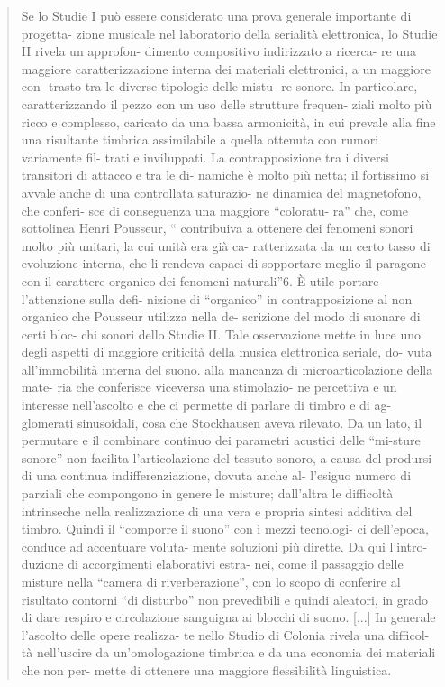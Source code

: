 \begin{quote}
Se lo Studie I può essere considerato una prova generale importante di progetta- zione musicale nel laboratorio della serialità elettronica, lo Studie II rivela un approfon- dimento compositivo indirizzato a ricerca- re una maggiore caratterizzazione interna dei materiali elettronici, a un maggiore con- trasto tra le diverse tipologie delle mistu- re sonore. In particolare, caratterizzando il pezzo con un uso delle strutture frequen- ziali molto più ricco e complesso, caricato da una bassa armonicità, in cui prevale alla fine una risultante timbrica assimilabile a quella ottenuta con rumori variamente fil- trati e inviluppati. La contrapposizione tra i diversi transitori di attacco e tra le di- namiche è molto più netta; il fortissimo si avvale anche di una controllata saturazio- ne dinamica del magnetofono, che conferi- sce di conseguenza una maggiore “coloratu- ra” che, come sottolinea Henri Pousseur, “ contribuiva a ottenere dei fenomeni sonori molto più unitari, la cui unità era già ca- ratterizzata da un certo tasso di evoluzione interna, che li rendeva capaci di sopportare meglio il paragone con il carattere organico dei fenomeni naturali”6.
È utile portare l’attenzione sulla defi- nizione di “organico” in contrapposizione al non organico che Pousseur utilizza nella de- scrizione del modo di suonare di certi bloc- chi sonori dello Studie II. Tale osservazione mette in luce uno degli aspetti di maggiore criticità della musica elettronica seriale, do- vuta all’immobilità interna del suono. alla mancanza di microarticolazione della mate- ria che conferisce viceversa una stimolazio- ne percettiva e un interesse nell’ascolto e che ci permette di parlare di timbro e di ag- glomerati sinusoidali, cosa che Stockhausen aveva rilevato.
Da un lato, il permutare e il combinare continuo dei parametri acustici delle “mi-sture sonore” non facilita l’articolazione del tessuto sonoro, a causa del prodursi di una continua indifferenziazione, dovuta anche al- l’esiguo numero di parziali che compongono in genere le misture; dall’altra le difficoltà intrinseche nella realizzazione di una vera e propria sintesi additiva del timbro. Quindi il “comporre il suono” con i mezzi tecnologi- ci dell’epoca, conduce ad accentuare voluta- mente soluzioni più dirette. Da qui l’intro- duzione di accorgimenti elaborativi estra- nei, come il passaggio delle misture nella “camera di riverberazione”, con lo scopo di conferire al risultato contorni “di disturbo” non prevedibili e quindi aleatori, in grado di dare respiro e circolazione sanguigna ai blocchi di suono.
[...]
In generale l’ascolto delle opere realizza- te nello Studio di Colonia rivela una difficol- tà nell’uscire da un’omologazione timbrica e da una economia dei materiali che non per- mette di ottenere una maggiore flessibilità linguistica.

\end{quote}
